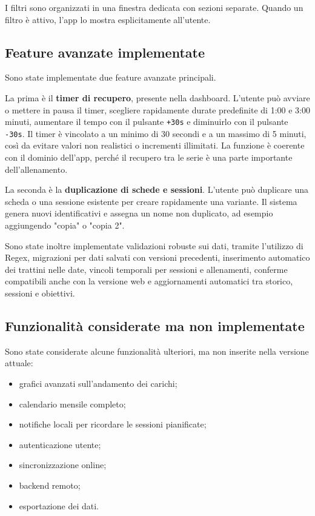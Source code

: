 \documentclass[11pt,a4paper]{article}
\begin{document}
I filtri sono organizzati in una finestra dedicata con sezioni separate. Quando un filtro è attivo, l'app lo mostra esplicitamente all'utente.

\subsection{Feature avanzate implementate}

Sono state implementate due feature avanzate principali.

La prima è il \textbf{timer di recupero}, presente nella dashboard. L'utente può avviare o mettere in pausa il timer, scegliere rapidamente durate predefinite di 1:00 e 3:00 minuti, aumentare il tempo con il pulsante \texttt{+30s} e diminuirlo con il pulsante \texttt{-30s}. Il timer è vincolato a un minimo di 30 secondi e a un massimo di 5 minuti, così da evitare valori non realistici o incrementi illimitati. La funzione è coerente con il dominio dell'app, perché il recupero tra le serie è una parte importante dell'allenamento.

La seconda è la \textbf{duplicazione di schede e sessioni}. L'utente può duplicare una scheda o una sessione esistente per creare rapidamente una variante. Il sistema genera nuovi identificativi e assegna un nome non duplicato, ad esempio aggiungendo "copia" o "copia 2".

Sono state inoltre implementate validazioni robuste sui dati, tramite l'utilizzo di Regex, migrazioni per dati salvati con versioni precedenti, inserimento automatico dei trattini nelle date, vincoli temporali per sessioni e allenamenti, conferme compatibili anche con la versione web e aggiornamenti automatici tra storico, sessioni e obiettivi.

\subsection{Funzionalità considerate ma non implementate}

Sono state considerate alcune funzionalità ulteriori, ma non inserite nella versione attuale:

\begin{itemize}
  \item grafici avanzati sull'andamento dei carichi;
  \item calendario mensile completo;
  \item notifiche locali per ricordare le sessioni pianificate;
  \item autenticazione utente;
  \item sincronizzazione online;
  \item backend remoto;
  \item esportazione dei dati.
\end{itemize}
\end{document}
